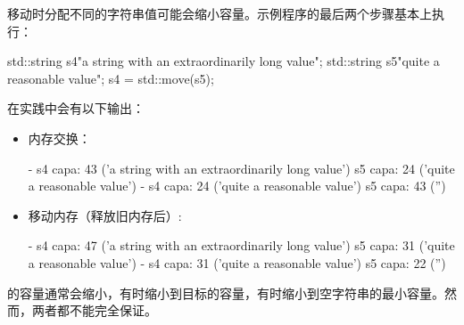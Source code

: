 移动时分配不同的字符串值可能会缩小容量。示例程序的最后两个步骤基本上执行：

\begin{cppcode}
std::string s4{"a string with an extraordinarily long value"};
std::string s5{"quite a reasonable value"};
s4 = std::move(s5);
\end{cppcode}

在实践中会有以下输出：

\begin{itemize}
	\item 内存交换：
	\begin{outputcode}
- s4 capa: 43 ('a string with an extraordinarily long value')
s5 capa: 24 ('quite a reasonable value')
- s4 capa: 24 ('quite a reasonable value')
s5 capa: 43 ('')
	\end{outputcode}
	\item 移动内存（释放旧内存后）:
	\begin{outputcode}
- s4 capa: 47 ('a string with an extraordinarily long value')
s5 capa: 31 ('quite a reasonable value')
- s4 capa: 31 ('quite a reasonable value')
s5 capa: 22 ('')
	\end{outputcode}
\end{itemize}

的容量通常会缩小，有时缩小到目标的容量，有时缩小到空字符串的最小容量。然而，两者都不能完全保证。
